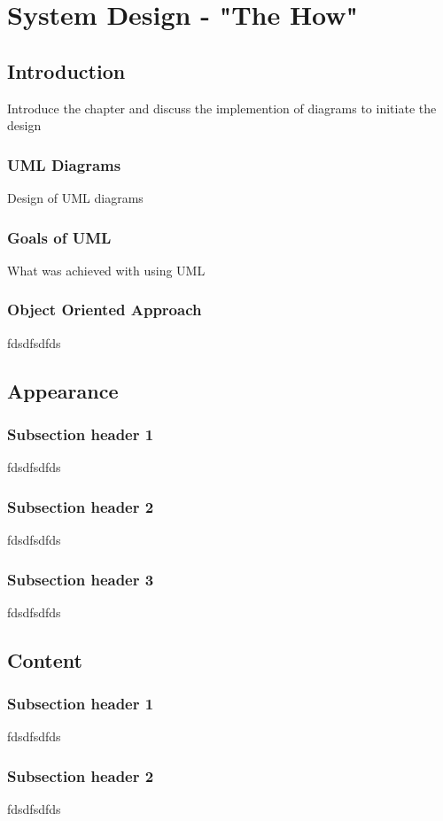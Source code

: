 \chapter{System Design - "The How"}


\section{Introduction}

Introduce the chapter and discuss the implemention of diagrams to initiate the design

\subsection{UML Diagrams}
Design of UML diagrams
\subsection{Goals of UML}
What was achieved with using UML
\subsection{Object Oriented Approach}
fdsdfsdfds


\section{Appearance}

\subsection{Subsection header 1}
fdsdfsdfds
\subsection{Subsection header 2}
fdsdfsdfds
\subsection{Subsection header 3}
fdsdfsdfds

\section{Content}

\subsection{Subsection header 1}
fdsdfsdfds
\subsection{Subsection header 2}
fdsdfsdfds
